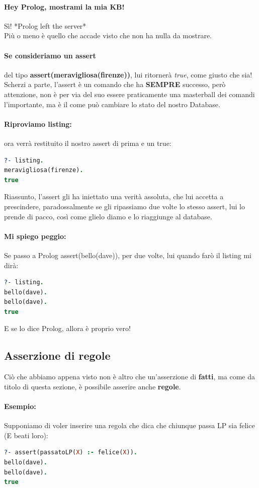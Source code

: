 \documentclass[12pt, a4paper, openany, oneside]{book}
\begin{document}
\paragraph{Hey Prolog, mostrami la mia KB! }Sì! *Prolog left the server*\\
Più o meno è quello che accade visto che non ha nulla da mostrare.
\paragraph{Se consideriamo un assert} del tipo 
\textbf{assert(meravigliosa(firenze))}, lui ritornerà \textit{true}, come giusto
che sia! Scherzi a parte, l'assert è un comando che ha \textbf{SEMPRE} successo,
però attenzione, non è per via del suo essere praticamente una masterball dei
comandi l'importante, ma è il come può cambiare lo stato del nostro Database.
\paragraph{Riproviamo listing: } ora verrà restituito il nostro assert di prima
e un true:
\begin{lstlisting}[language=Prolog] 
?- listing.
meravigliosa(firenze).
true
\end{lstlisting} 
Riassunto, l'assert gli ha iniettato una verità assoluta, che lui accetta a 
prescindere, paradossalmente se gli ripassiamo due volte lo stesso assert, lui 
lo prende di pacco, così come glielo diamo e lo riaggiunge al database.
\paragraph{Mi spiego peggio: } Se passo a Prolog assert(bello(dave)), per due 
volte, lui quando farò il listing mi dirà:
\begin{lstlisting}[language=Prolog] 
?- listing.
bello(dave).
bello(dave).
true
\end{lstlisting} 
E se lo dice Prolog, allora è proprio vero!
\subsection{Asserzione di regole}
Ciò che abbiamo appena visto non è altro che un'asserzione di \textbf{fatti}, ma
come da titolo di questa sezione, è possibile asserire anche \textbf{regole}.
\paragraph{Esempio: } Supponiamo di voler inserire una regola che dica che 
chiunque passa LP sia felice (E beati loro):
\begin{lstlisting}[language=Prolog] 
?- assert(passatoLP(X) :- felice(X)).
bello(dave).
bello(dave).
true
\end{lstlisting} 
\end{document}
